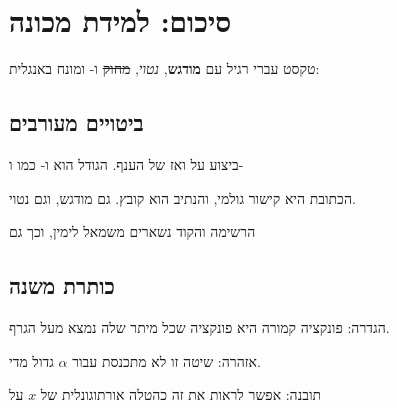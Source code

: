\documentclass[
]{article}
\author{}
\date{}
\def\st#1{\sout{#1}}
\begin{document}
\section{סיכום: למידת
מכונה}\label{ux5e1ux5d9ux5dbux5d5ux5dd-ux5dcux5deux5d9ux5d3ux5ea-ux5deux5dbux5d5ux5e0ux5d4}

טקסט עברי רגיל עם \textbf{מודגש}, \emph{נטוי}, \st{מחוק}
ו-\RL{,} ומונח באנגלית:

\subsection{ביטויים
מעורבים}\label{ux5d1ux5d9ux5d8ux5d5ux5d9ux5d9ux5dd-ux5deux5e2ux5d5ux5e8ux5d1ux5d9ux5dd}

ביצוע  על \RL{,} ואז
 של הענף. הגודל הוא 
ו-\RL{,} כמו
 ו-

הכתובת  היא קישור גולמי, והנתיב
 הוא קובץ. גם \textbf{} מודגש, וגם
\emph{} נטוי.

הרשימה  והקוד
 נשארים משמאל לימין, וכך
גם 

\subsection{כותרת
משנה}\label{ux5dbux5d5ux5eaux5e8ux5ea-ux5deux5e9ux5e0ux5d4}

\begin{calloutdefinition}

הגדרה: פונקציה קמורה היא פונקציה שכל מיתר שלה נמצא מעל הגרף.

\end{calloutdefinition}

\begin{calloutwarning}

אזהרה: שיטה זו לא מתכנסת עבור \(\alpha\) גדול מדי.

\end{calloutwarning}

\begin{calloutinsight}

תובנה: אפשר לראות את זה כהטלה אורתוגונלית של \(x\) על

\end{calloutinsight}
\end{document}

